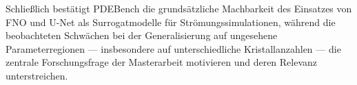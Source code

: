 \documentclass[a4paper,12pt]{article}
\begin{document}
Schließlich bestätigt PDEBench die grundsätzliche Machbarkeit des Einsatzes von
FNO und U-Net als Surrogatmodelle für Strömungssimulationen, während die
beobachteten Schwächen bei der Generalisierung auf ungesehene Parameterregionen ---
insbesondere auf unterschiedliche Kristallanzahlen --- die zentrale Forschungsfrage
der Masterarbeit motivieren und deren Relevanz unterstreichen.
\end{document}

